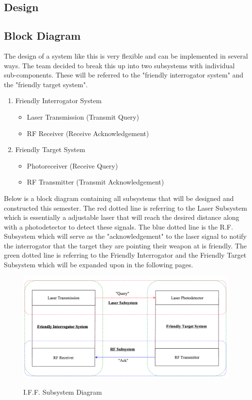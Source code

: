 \documentclass[openbib,letterpaper,10pt]{article}
\begin{document}
\begin{spacing}{1.15}
\clearpage

\section{Design}
\subsection{Block Diagram}
The design of a system like this is very flexible and can be implemented in several ways. The team decided to break this up into two subsystems with individual sub-components. These will be referred to the "friendly interrogator system" and the "friendly target system". 
\begin{enumerate}
	\item Friendly Interrogator System
	\begin{itemize}
		\item Laser Transmission (Transmit Query)
		\item RF Receiver (Receive Acknowledgement)
	\end{itemize}
	\item Friendly Target System
	\begin{itemize}
		\item Photoreceiver (Receive Query)
		\item RF Transmitter (Transmit Acknowledgement)
	\end{itemize}
\end{enumerate}

Below is a block diagram containing all subsystems that will be designed and constructed this semester. The red dotted line is referring to the Laser Subsystem which is essentially a adjustable laser that will reach the desired distance along with a photodetector to detect these signals. The blue dotted line is the R.F. Subsystem which will serve as the "acknowledgement" to the laser signal to notify the interrogator that the target they are pointing their weapon at is friendly. The green dotted line is referring to the Friendly Interrogator and the Friendly Target Subsystem which will be expanded upon in the following pages.
\begin{figure} [H]
	\centering
	\includegraphics[scale=0.5]{System_Diagram.png}
	\label{fig:system-diagram}
	\caption{I.F.F. Subsystem Diagram}
\end{figure}
\clearpage


\end{spacing}
\end{document}
